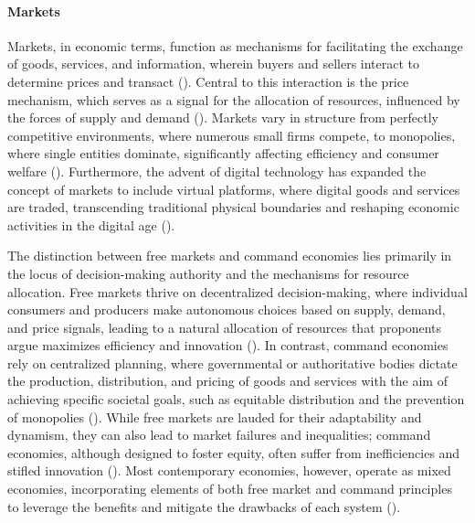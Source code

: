 \documentclass{article}
\begin{document}
\paragraph{Markets}
Markets, in economic terms, function as mechanisms for facilitating the exchange of goods, services, and information, wherein buyers and sellers interact to determine prices and transact (\cite{marshall}). Central to this interaction is the price mechanism, which serves as a signal for the allocation of resources, influenced by the forces of supply and demand (\cite{smith}). Markets vary in structure from perfectly competitive environments, where numerous small firms compete, to monopolies, where single entities dominate, significantly affecting efficiency and consumer welfare (\cite{schumpeter}). Furthermore, the advent of digital technology has expanded the concept of markets to include virtual platforms, where digital goods and services are traded, transcending traditional physical boundaries and reshaping economic activities in the digital age (\cite{digitalEconomy}).\par

The distinction between free markets and command economies lies primarily in the locus of decision-making authority and the mechanisms for resource allocation. Free markets thrive on decentralized decision-making, where individual consumers and producers make autonomous choices based on supply, demand, and price signals, leading to a natural allocation of resources that proponents argue maximizes efficiency and innovation (\cite{friedman}). In contrast, command economies rely on centralized planning, where governmental or authoritative bodies dictate the production, distribution, and pricing of goods and services with the aim of achieving specific societal goals, such as equitable distribution and the prevention of monopolies (\cite{hayek}). While free markets are lauded for their adaptability and dynamism, they can also lead to market failures and inequalities; command economies, although designed to foster equity, often suffer from inefficiencies and stifled innovation (\cite{marx}). Most contemporary economies, however, operate as mixed economies, incorporating elements of both free market and command principles to leverage the benefits and mitigate the drawbacks of each system (\cite{mixedEconomy}).
\end{document}
